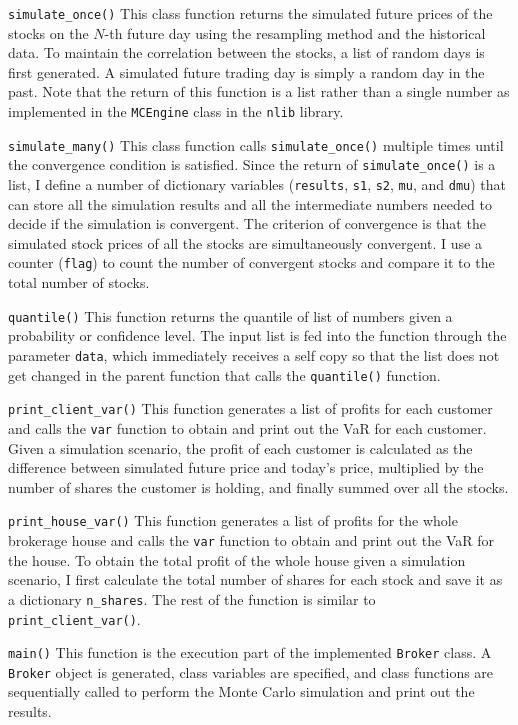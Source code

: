 \documentclass[letterpaper,11pt]{article}
\begin{document}
\texttt{simulate\_once()} This class function returns the simulated future prices of the stocks on the $N$-th future day using the resampling method and the historical data.
To maintain the correlation between the stocks, a list of random days is first generated.
A simulated future trading day is simply a random day in the past.
Note that the return of this function is a list rather than a single number as implemented in the \texttt{MCEngine} class in the \texttt{nlib} library.

\texttt{simulate\_many()} This class function calls \texttt{simulate\_once()} multiple times until the convergence condition is satisfied.
Since the return of \texttt{simulate\_once()} is a list, I define a number of dictionary variables (\texttt{results}, \texttt{s1}, \texttt{s2}, \texttt{mu}, and \texttt{dmu}) that can store all the simulation results and all the intermediate numbers needed to decide if the simulation is convergent.
The criterion of convergence is that the simulated stock prices of all the stocks are simultaneously convergent.
I use a counter (\texttt{flag}) to count the number of convergent stocks and compare it to the total number of stocks.

\texttt{quantile()} This function returns the quantile of list of numbers given a probability or confidence level. 
The input list is fed into the function through the parameter \texttt{data}, which immediately receives a self copy so that the list does not get changed in the parent function that calls the \texttt{quantile()} function.

\texttt{print\_client\_var()} This function generates a list of profits for each customer and calls the \texttt{var} function to obtain and print out the VaR for each customer.
Given a simulation scenario, the profit of each customer is calculated as the difference between simulated future price and today's price,  multiplied by the number of shares the customer is holding, and finally summed over all the stocks.

\texttt{print\_house\_var()} This function generates a list of profits for the whole brokerage house and calls the \texttt{var} function to obtain and print out the VaR for the house.
To obtain the total profit of the whole house given a simulation scenario, I first calculate the total number of shares for each stock and save it as a dictionary \texttt{n\_shares}.
The rest of the function is similar to \texttt{print\_client\_var()}.

\texttt{main()} This function is the execution part of the implemented \texttt{Broker} class.
A \texttt{Broker} object is generated, class variables are specified, and class functions are sequentially called to perform the Monte Carlo simulation and print out the results.
\end{document}
